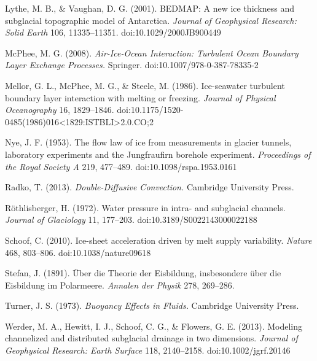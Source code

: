 \documentclass[tc, manuscript]{copernicus}
\begin{document}
\begin{thebibliography}{}
Lythe, M. B., \& Vaughan, D. G. (2001). BEDMAP: A new ice thickness and subglacial topographic model of Antarctica. \emph{Journal of Geophysical Research: Solid Earth} 106, 11335–11351. doi:10.1029/2000JB900449

McPhee, M. G. (2008). \emph{Air-Ice-Ocean Interaction: Turbulent Ocean Boundary Layer Exchange Processes.} Springer. doi:10.1007/978-0-387-78335-2

Mellor, G. L., McPhee, M. G., \& Steele, M. (1986). Ice-seawater turbulent boundary layer interaction with melting or freezing. \emph{Journal of Physical Oceanography} 16, 1829–1846. doi:10.1175/1520-0485(1986)016<1829:ISTBLI>2.0.CO;2

Nye, J. F. (1953). The flow law of ice from measurements in glacier tunnels, laboratory experiments and the Jungfraufirn borehole experiment. \emph{Proceedings of the Royal Society A} 219, 477–489. doi:10.1098/rspa.1953.0161

Radko, T. (2013). \emph{Double-Diffusive Convection.} Cambridge University Press.

Röthlisberger, H. (1972). Water pressure in intra- and subglacial channels. \emph{Journal of Glaciology} 11, 177–203. doi:10.3189/S0022143000022188

Schoof, C. (2010). Ice-sheet acceleration driven by melt supply variability. \emph{Nature} 468, 803–806. doi:10.1038/nature09618

Stefan, J. (1891). Über die Theorie der Eisbildung, insbesondere über die Eisbildung im Polarmeere. \emph{Annalen der Physik} 278, 269–286.

Turner, J. S. (1973). \emph{Buoyancy Effects in Fluids.} Cambridge University Press.

Werder, M. A., Hewitt, I. J., Schoof, C. G., \& Flowers, G. E. (2013). Modeling channelized and distributed subglacial drainage in two dimensions. \emph{Journal of Geophysical Research: Earth Surface} 118, 2140–2158. doi:10.1002/jgrf.20146

\end{thebibliography}
\end{document}
